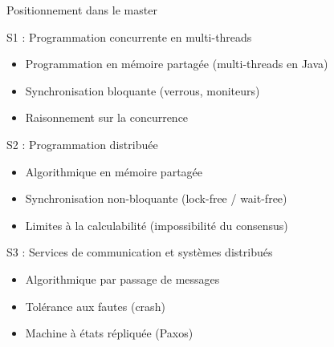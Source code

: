 
\begingroup

\begin{frame}{Positionnement dans le master}

  \begin{block}{S1 : Programmation concurrente en multi-threads}
    \begin{itemize}
    \item Programmation en mémoire partagée (multi-threads en Java)
    \item Synchronisation bloquante (verrous, moniteurs)
    \item Raisonnement sur la concurrence
    \end{itemize}
  \end{block}

  \begin{block}{S2 : Programmation distribuée}
    \begin{itemize}
    \item Algorithmique en mémoire partagée
    \item Synchronisation non-bloquante (lock-free / wait-free)
    \item Limites à la calculabilité (impossibilité du consensus)
    \end{itemize}
  \end{block}

  \begin{alertblock}{S3 : Services de communication et systèmes distribués}
    \begin{itemize}
    \item Algorithmique par passage de messages
    \item Tolérance aux fautes (crash)
    \item Machine à états répliquée (Paxos)
    \end{itemize}
  \end{alertblock}

\end{frame}

\endgroup
\endinput
